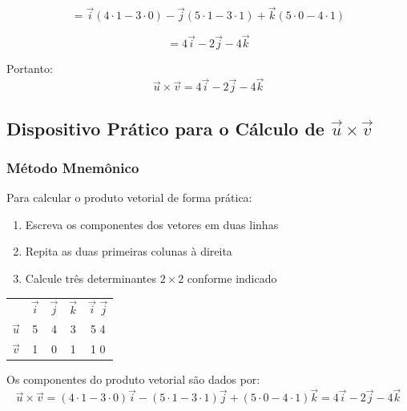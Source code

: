 \[
  = \vec{i}(4 \cdot 1 - 3 \cdot 0) - \vec{j}(5 \cdot 1 - 3 \cdot 1) + \vec{k}(5 \cdot 0 - 4 \cdot 1)
\]

\[
  = 4\vec{i} - 2\vec{j} - 4\vec{k}
\]

Portanto:
\[
  \vec{u} \times \vec{v} = 4\vec{i} - 2\vec{j} - 4\vec{k}
\]

\subsection{Dispositivo Prático para o Cálculo de $\vec{u} \times \vec{v}$}

\subsubsection*{Método Mnemônico}

Para calcular o produto vetorial de forma prática:
\begin{enumerate}
  \item Escreva os componentes dos vetores em duas linhas
  \item Repita as duas primeiras colunas à direita
  \item Calcule três determinantes $2 \times 2$ conforme indicado
\end{enumerate}

\begin{center}
\begin{tabular}{ccccc}
  & $\vec{i}$ & $\vec{j}$ & $\vec{k}$ & $\vec{i}$ $\vec{j}$ \\
  $\vec{u}$ & 5 & 4 & 3 & 5 4 \\
  $\vec{v}$ & 1 & 0 & 1 & 1 0 \\
\end{tabular}
\end{center}

Os componentes do produto vetorial são dados por:
\[
  \vec{u} \times \vec{v} = (4\cdot1-3\cdot0)\vec{i} - (5\cdot1-3\cdot1)\vec{j} + (5\cdot0-4\cdot1)\vec{k} = 4\vec{i} - 2\vec{j} - 4\vec{k}
\]

